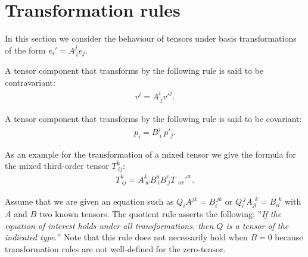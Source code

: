 
\section{Transformation rules}

    In this section we consider the behaviour of tensors under basis transformations of the form $e_i' = A^j_{\ i}e_j$.

    \begin{definition}[Contravariant]\label{tensorcalculus:contravariant}
        A tensor component that transforms by the following rule is said to be contravariant:
        \begin{gather}
            v^i = A^i_{\ j}v'^j.
        \end{gather}
    \end{definition}

    \begin{definition}[Covariant]\label{tensorcalculus:covariant}
        A tensor component that transforms by the following rule is said to be covariant:
        \begin{gather}
            p_i = B^j_{\ i}\ p'_j.
        \end{gather}
    \end{definition}

    \begin{example}
        As an example for the transformation of a mixed tensor we give the formula for the mixed third-order tensor $T_{\ ij}^k$:
        \begin{gather}
            T_{\ ij}^k = A^k_{\ w}B^u_{\ i}B^v_{\ j}T_{\ \ uv}'^w.
        \end{gather}
    \end{example}

    \begin{method}
        Assume that we are given an equation such as $Q_iA^{jk} = B_i^{\ jk}$ or $Q_i^{\ j}A_{jl}^{\ \ k} = B_{il}^{\ \ k}$ with $A$ and $B$ two known tensors. The quotient rule asserts the following: ''\textit{If the equation of interest holds under all transformations, then $Q$ is a tensor of the indicated type.}'' Note that this rule does not necessarily hold when $B=0$ because transformation rules are not well-defined for the zero-tensor.
    \end{method}


